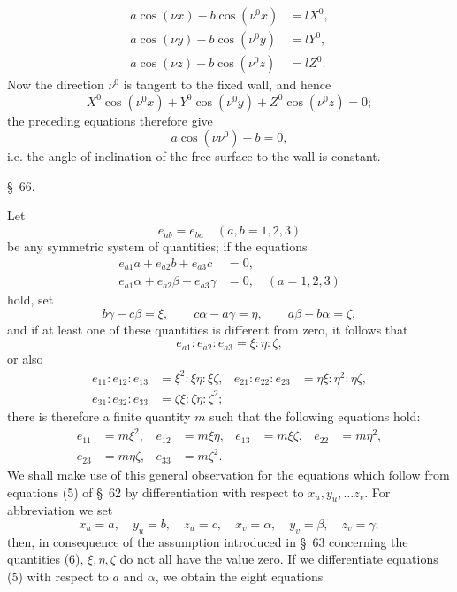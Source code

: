 \documentclass[11pt,a4paper,leqno]{article}
\begin{document}
\[
\begin{aligned}
a\cos(\nu x)-b\cos(\nu^0x)&=lX^0,\\
a\cos(\nu y)-b\cos(\nu^0y)&=lY^0,\\
a\cos(\nu z)-b\cos(\nu^0z)&=lZ^0.
\end{aligned}
\]
Now the direction $\nu^0$ is tangent to the fixed wall, and hence
\[
X^0\cos(\nu^0x)+Y^0\cos(\nu^0y)+Z^0\cos(\nu^0z)=0;
\]
the preceding equations therefore give
\[
a\cos(\nu\nu^0)-b=0,
\]
i.e. the angle of inclination of the free surface to the wall is constant.


\begin{center}
{\large \S~66.}
\end{center}

Let
\[
e_{ab}=e_{ba}\quad(a,b=1,2,3)
\]
be any symmetric system of quantities; if the equations
\begin{equation}\tag{18}
\begin{aligned}
e_{a1}a+e_{a2}b+e_{a3}c&=0,\\
e_{a1}\alpha+e_{a2}\beta+e_{a3}\gamma&=0,\quad(a=1,2,3)
\end{aligned}
\end{equation}
hold, set
\[
b\gamma-c\beta=\xi,\qquad c\alpha-a\gamma=\eta,
\qquad a\beta-b\alpha=\zeta,
\]
and if at least one of these quantities is different from zero,
it follows that
\[
e_{a1}:e_{a2}:e_{a3}=\xi:\eta:\zeta,
\]
or also
\[
\begin{aligned}
e_{11}:e_{12}:e_{13}&=\xi^2:\xi\eta:\xi\zeta,
&e_{21}:e_{22}:e_{23}&=\eta\xi:\eta^2:\eta\zeta,\\
e_{31}:e_{32}:e_{33}&=\zeta\xi:\zeta\eta:\zeta^2;
\end{aligned}
\]
there is therefore a finite quantity $m$ such that the following
equations hold:
\[
\begin{aligned}
e_{11}&=m\xi^2,&e_{12}&=m\xi\eta,&e_{13}&=m\xi\zeta,&e_{22}&=m\eta^2,\\
e_{23}&=m\eta\zeta,&e_{33}&=m\zeta^2.
\end{aligned}
\]
We shall make use of this general observation for the equations
which follow from equations (5) of \S~62 by differentiation with
respect to $x_u,y_u,\ldots z_v$. For abbreviation we set
\[
x_u=a,\quad y_u=b,\quad z_u=c,\quad x_v=\alpha,\quad y_v=\beta,\quad z_v=\gamma;
\]
then, in consequence of the assumption introduced in \S~63 concerning
the quantities (6), $\xi,\eta,\zeta$ do not all have the value zero. If we
differentiate equations (5) with respect to $a$ and $\alpha$, we obtain the
eight equations
\end{document}
